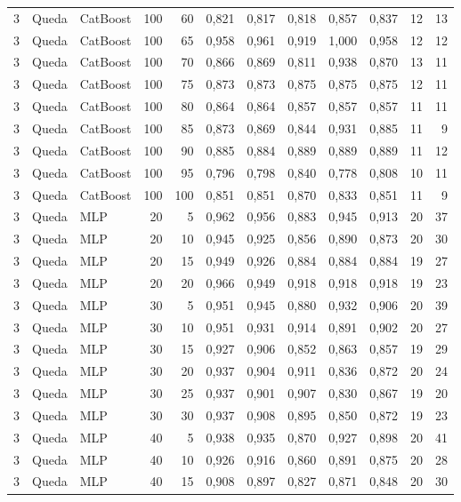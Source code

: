 \begin{longtable}{@{}rllrrrrrrrrr@{}}
3 & Queda & CatBoost & 100 & 60 & 0,821 & 0,817 & 0,818 & 0,857 & 0,837 & 12 & 13 \\
3 & Queda & CatBoost & 100 & 65 & 0,958 & 0,961 & 0,919 & 1,000 & 0,958 & 12 & 12 \\
3 & Queda & CatBoost & 100 & 70 & 0,866 & 0,869 & 0,811 & 0,938 & 0,870 & 13 & 11 \\
3 & Queda & CatBoost & 100 & 75 & 0,873 & 0,873 & 0,875 & 0,875 & 0,875 & 12 & 11 \\
3 & Queda & CatBoost & 100 & 80 & 0,864 & 0,864 & 0,857 & 0,857 & 0,857 & 11 & 11 \\
3 & Queda & CatBoost & 100 & 85 & 0,873 & 0,869 & 0,844 & 0,931 & 0,885 & 11 & 9 \\
3 & Queda & CatBoost & 100 & 90 & 0,885 & 0,884 & 0,889 & 0,889 & 0,889 & 11 & 12 \\
3 & Queda & CatBoost & 100 & 95 & 0,796 & 0,798 & 0,840 & 0,778 & 0,808 & 10 & 11 \\
3 & Queda & CatBoost & 100 & 100 & 0,851 & 0,851 & 0,870 & 0,833 & 0,851 & 11 & 9 \\
3 & Queda & MLP & 20 & 5 & 0,962 & 0,956 & 0,883 & 0,945 & 0,913 & 20 & 37 \\
3 & Queda & MLP & 20 & 10 & 0,945 & 0,925 & 0,856 & 0,890 & 0,873 & 20 & 30 \\
3 & Queda & MLP & 20 & 15 & 0,949 & 0,926 & 0,884 & 0,884 & 0,884 & 19 & 27 \\
3 & Queda & MLP & 20 & 20 & 0,966 & 0,949 & 0,918 & 0,918 & 0,918 & 19 & 23 \\
3 & Queda & MLP & 30 & 5 & 0,951 & 0,945 & 0,880 & 0,932 & 0,906 & 20 & 39 \\
3 & Queda & MLP & 30 & 10 & 0,951 & 0,931 & 0,914 & 0,891 & 0,902 & 20 & 27 \\
3 & Queda & MLP & 30 & 15 & 0,927 & 0,906 & 0,852 & 0,863 & 0,857 & 19 & 29 \\
3 & Queda & MLP & 30 & 20 & 0,937 & 0,904 & 0,911 & 0,836 & 0,872 & 20 & 24 \\
3 & Queda & MLP & 30 & 25 & 0,937 & 0,901 & 0,907 & 0,830 & 0,867 & 19 & 20 \\
3 & Queda & MLP & 30 & 30 & 0,937 & 0,908 & 0,895 & 0,850 & 0,872 & 19 & 23 \\
3 & Queda & MLP & 40 & 5 & 0,938 & 0,935 & 0,870 & 0,927 & 0,898 & 20 & 41 \\
3 & Queda & MLP & 40 & 10 & 0,926 & 0,916 & 0,860 & 0,891 & 0,875 & 20 & 28 \\
3 & Queda & MLP & 40 & 15 & 0,908 & 0,897 & 0,827 & 0,871 & 0,848 & 20 & 30 \\

\end{longtable}
